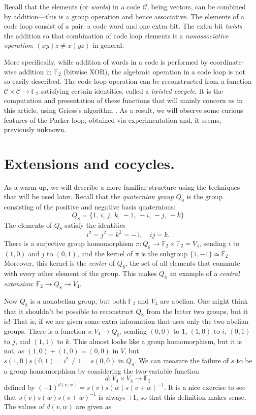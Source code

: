 \documentclass{article}
\theoremstyle{plain}
\theoremstyle{definition}
\def \cC {\mathcal{C}}
\def \FF {\mathbb{F}}
\begin{document}
Recall that the elements (or \emph{words}) in a code $\cC$, being vectors, can be combined by addition---this is a group operation and hence associative. 
The elements of a code loop consist of a pair: a code word and one extra bit.
The extra bit \emph{twists} the addition so that combination of code loop elements is a \emph{nonassociative operation}: $(xy)z\not=x(yz)$ in general.

More specifically, while addition of words in a code is performed by coordinate-wise addition in $\FF_2$ (bitwise XOR), the algebraic operation in a code loop is not so easily described.
The code loop operation can be reconstructed from a function $\cC \times \cC \to \FF_2$ satisfying certain identities, called a \emph{twisted cocycle}.
It is the computation and presentation of these functions that will mainly concern us in this article, using Griess's algorithm \cite[proof of Theorem 10]{Griess}.
As a result, we will observe some curious features of the Parker loop, obtained via experimentation and, it seems, previously unknown.

\section{Extensions and cocycles.}

As a warm-up, we will describe a more familiar structure using the techniques that will be used later. 
Recall that the \emph{quaternion group} $Q_8$ is the group consisting of the positive and negative basis quaternions:
\[
	Q_8 = \{1,\, i,\, j,\, k,\,-1,\, -i,\, -j,\, -k\}
\]
The elements of $Q_8$ satisfy the identities
\[
	i^2 = j^2 = k^2 = -1, \quad ij=k.
\]
There is a surjective group homomorphism $\pi\colon Q_8 \to \FF_2 \times \FF_2 = V_4$, sending $i$ to $(1,0)$ and $j$ to $(0,1)$, and the kernel of $\pi$ is the subgroup $\{1,-1\}\simeq \FF_2$.
Moreover, this kernel is the \emph{center} of $Q_8$, the set of all elements that commute with every other element of the group. This makes $Q_8$ an example of a \emph{central extension}: $\FF_2\to Q_8 \to V_4$.

Now $Q_8$ is a nonabelian group, but both $\FF_2$ and $V_4$ are abelian.
One might think that it shouldn't be possible to reconstruct $Q_8$ from the latter two groups, but it is! 
That is, if we are given some extra information that uses only the two abelian groups.
There is a function $s\colon V_4 \to Q_8$, sending $(0,0)$ to $1$, $(1,0)$ to $i$, $(0,1)$ to $j$, and $(1,1)$ to $k$.
This almost looks like a group homomorphism, but it is not, as $(1,0) + (1,0) = (0,0)$ in $V$, but $s(1,0)s(0,1) = i^2 \not= 1 = s(0,0)$ in $Q_8$.
We can measure the failure of $s$ to be a group homomorphism by considering the two-variable function
\[
	d\colon V_4 \times V_4 \to \FF_2
\]
defined by $ (-1)^{d(v,w)} = s(v)s(w)s(v+w)^{-1}$. 
It is a nice exercise to see that $s(v)s(w)s(v+w)^{-1}$ is always $\pm 1$, so that this definition makes sense. The values of $d(v,w)$ are given as
\end{document}
